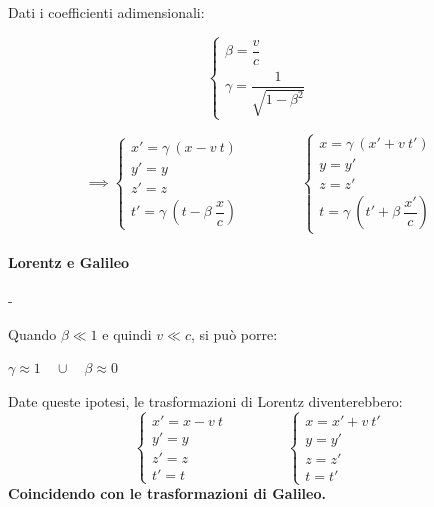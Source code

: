 \documentclass[a4paper,12pt]{report}
\begin{document}
Dati i coefficienti adimensionali:
\begin{center}
\begin{equation}
      \begin{cases}
        \beta = \dfrac{v}{c}\\
        \gamma = \dfrac{1}{\sqrt{1- \beta^2}}
      \end{cases}\,
\end{equation}
\end{center}
\begin{center}
\begin{equation}
\implies
	  \begin{cases}
        x'= \gamma\:(x - v\:t)\\
        y'=y\\
        z'=z\\
        t'=\gamma\:(t-\beta\:\dfrac{x}{c})
      \end{cases}\,
      \qquad \qquad
      \begin{cases}
        x=\gamma\:(x' + v\:t')\\
        y=y'\\
        z=z'\\
        t=\gamma\:(t' + \beta\:\dfrac{x'}{c})
      \end{cases}
\end{equation}
\end{center}

\paragraph{Lorentz e Galileo}-\\
\medskip

Quando $\beta \ll 1$ e quindi $v \ll c$, si può porre: \\
\begin{center}
$\gamma \approx 1 \quad \cup \quad \beta \approx 0 $
\end{center}
Date queste ipotesi, le trasformazioni di Lorentz diventerebbero:
\begin{equation}
	  \begin{cases}
        x'= x - v\:t\\
        y'=y\\
        z'=z\\
        t'=t
      \end{cases}\,
      \qquad \qquad
      \begin{cases}
        x=x' + v\:t'\\
        y=y'\\
        z=z'\\
        t=t'
      \end{cases}
\end{equation}
\textbf{Coincidendo con le trasformazioni di Galileo.}
\end{document}
